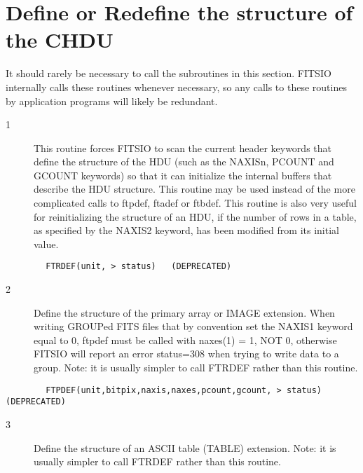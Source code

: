 \documentclass[11pt]{book}
\begin{document}
\section{Define or Redefine the structure of the CHDU \label{FTRDEF}}

It should rarely be necessary to call the subroutines in this section.
FITSIO internally calls these routines whenever necessary, so any calls
to these routines by application programs will likely be redundant.


\begin{description}
\item[1 ] This routine forces FITSIO to scan the current header keywords that
    define the structure of the HDU (such as the NAXISn, PCOUNT and GCOUNT
    keywords) so that it can initialize the internal buffers that describe
    the HDU structure.  This routine may be used instead of the more
    complicated calls to ftpdef, ftadef or ftbdef.  This routine is
    also very useful for reinitializing the structure of an HDU,
    if the number of rows in a table, as specified by the NAXIS2 keyword,
   has been modified from its initial value.
\end{description}

\begin{verbatim}
        FTRDEF(unit, > status)   (DEPRECATED)
\end{verbatim}

\begin{description}
\item[2 ]Define the structure of the primary array or IMAGE extension.  When
   writing GROUPed FITS files that by convention set the NAXIS1 keyword
   equal to 0, ftpdef must be called with naxes(1) = 1, NOT 0, otherwise
   FITSIO will report an error status=308 when trying to write data
   to a group. Note: it is usually simpler to call FTRDEF rather
  than this routine.
\end{description}

\begin{verbatim}
        FTPDEF(unit,bitpix,naxis,naxes,pcount,gcount, > status)  (DEPRECATED)
\end{verbatim}

\begin{description}
\item[3 ] Define the structure of an ASCII table (TABLE) extension. Note: it
   is usually simpler to call FTRDEF rather than this routine.
\end{description}
\end{document}
